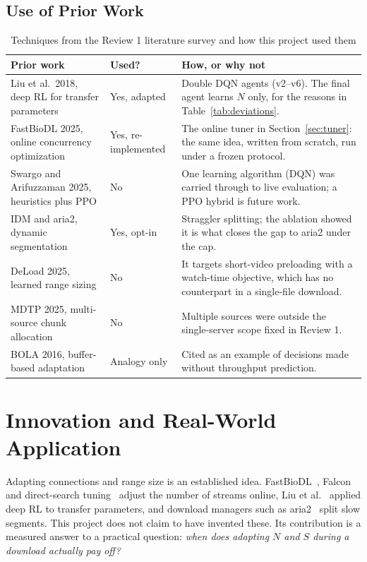 \section{Use of Prior Work}
\begin{table}[H]\centering
\caption{Techniques from the Review 1 literature survey and how this project used them}\label{tab:prior}
\begin{tabularx}{\linewidth}{@{}P{3.6cm}P{2.2cm}L@{}}
\toprule
\textbf{Prior work} & \textbf{Used?} & \textbf{How, or why not}\\
\midrule
Liu et al.\ 2018, deep RL for transfer parameters & Yes, adapted & Double DQN agents (v2--v6). The final agent learns $N$ only, for the reasons in Table~\ref{tab:deviations}.\\
FastBioDL 2025, online concurrency optimization & Yes, re-implemented & The online tuner in Section~\ref{sec:tuner}: the same idea, written from scratch, run under a frozen protocol.\\
Swargo and Arifuzzaman 2025, heuristics plus PPO & No & One learning algorithm (DQN) was carried through to live evaluation; a PPO hybrid is future work.\\
IDM and aria2, dynamic segmentation & Yes, opt-in & Straggler splitting; the ablation showed it is what closes the gap to aria2 under the cap.\\
DeLoad 2025, learned range sizing & No & It targets short-video preloading with a watch-time objective, which has no counterpart in a single-file download.\\
MDTP 2025, multi-source chunk allocation & No & Multiple sources were outside the single-server scope fixed in Review 1.\\
BOLA 2016, buffer-based adaptation & Analogy only & Cited as an example of decisions made without throughput prediction.\\
\bottomrule
\end{tabularx}
\end{table}

\chapter{Innovation and Real-World Application}
Adapting connections and range size is an established idea. FastBioDL~\cite{fastbiodl}, Falcon~\cite{falcon} and direct-search tuning~\cite{balaprakash} adjust the number of streams online, Liu et al.~\cite{liu2018} applied deep RL to transfer parameters, and download managers such as aria2~\cite{aria2} split slow segments. This project does not claim to have invented these. Its contribution is a measured answer to a practical question: \emph{when does adapting $N$ and $S$ during a download actually pay off?}

